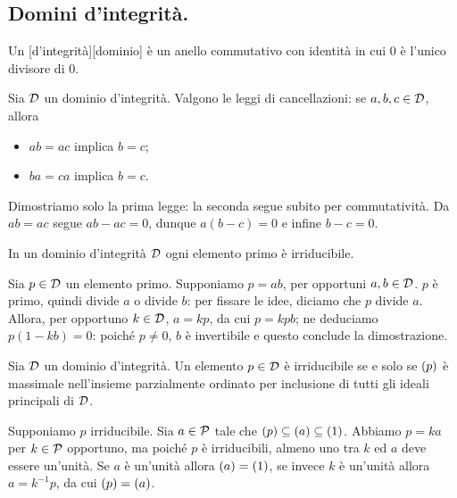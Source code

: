 \subsection{Domini d'integrit\`a.}\label{DominiDIntegrita}
\begin{Definition}
	Un [d'integrit\`a][dominio] \`e un anello commutativo con identit\`a in cui $0$ \`e l'unico divisore di $0$.
\end{Definition}
\begin{Theorem}
	Sia $\mathcal{D}$ un dominio d'integrit\`a. Valgono le leggi di cancellazioni: se $a, b, c \in \mathcal{D}$, allora
	\begin{itemize}
		\item $ab = ac$ implica $b = c$;
		\item $ba = ca$ implica $b = c$.
	\end{itemize}
\end{Theorem}
\Proof Dimostriamo solo la prima legge: la seconda segue subito per commutativit\`a. Da $ab = ac$ segue $ab - ac = 0$, dunque $a(b - c) = 0$ e infine $b - c = 0$. \EndProof
\begin{Theorem}
	In un dominio d'integrit\`a $\mathcal{D}$ ogni elemento primo \`e irriducibile.
\end{Theorem}
\Proof Sia $p \in \mathcal{D}$ un elemento primo. Supponiamo $p = ab$, per opportuni $a, b \in \mathcal{D}$. $p$ \`e primo, quindi divide $a$ o divide $b$: per fissare le idee, diciamo che $p$ divide $a$. Allora, per opportuno $k \in \mathcal{D}$, $a = kp$, da cui $p = kpb$; ne deduciamo $p(1 - kb) = 0$: poich\'e $p \neq 0$, $b$ \`e invertibile e questo conclude la dimostrazione. \EndProof
\begin{Theorem}\label{DomIntIrridMax}
	Sia $\mathcal{D}$ un dominio d'integrit\`a. Un elemento $p \in \mathcal{D}$ \`e irriducibile se e solo se $\left ( p \right )$ \`e massimale nell'insieme parzialmente ordinato per inclusione di tutti gli ideali principali di $\mathcal{D}$.
\end{Theorem}
\Proof Supponiamo $p$ irriducibile. Sia $a \in \mathcal{P}$ tale che $\left ( p \right ) \subseteq \left ( a \right ) \subseteq \left ( 1 \right )$. Abbiamo $p = ka$ per $k \in \mathcal{P}$ opportuno, ma poich\'e $p$ \`e irriducibili, almeno uno tra $k$ ed $a$ deve essere un'unit\`a. Se $a$ \`e un'unit\`a allora $\left ( a \right ) = \left ( 1 \right )$, se invece $k$ \`e un'unit\`a allora $a = k^{-1}p$, da cui $\left ( p \right ) = \left ( a \right )$. \EndProof
